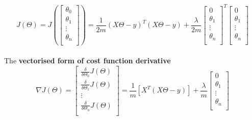 \documentclass{article}
\begin{document}
\begin{equation}
J(\Theta) = J\left( \begin{bmatrix} 
\theta_0 \\ 
\theta_1 \\
\vdots \\
\theta_n\\
\end{bmatrix} \right) = \frac{1}{2m} ( X\Theta - y )^T ( X\Theta - y ) +  \frac{\lambda}{2m}
\begin{bmatrix} 
0 \\ 
\theta_1 \\
\vdots \\
\theta_n\\
\end{bmatrix}^T
\begin{bmatrix} 
0 \\ 
\theta_1 \\
\vdots \\
\theta_n\\
\end{bmatrix}
\end{equation}\\
\color{black}
The \textbf{vectorised form of cost function derivative}
\color{red}
\begin{equation}
\nabla J(\Theta) = 
\begin{bmatrix} 
\frac{\delta}{\delta\Theta_0}J(\Theta)\\ 
\frac{\delta}{\delta\Theta_1}J(\Theta) \\
\vdots \\
\frac{\delta}{\delta\Theta_n}J(\Theta)\\
\end{bmatrix}  
= \frac{1}{m}
\left[X^T(X\Theta-y)\right]
+ \frac{\lambda}{m}
\begin{bmatrix} 
0 \\ 
\theta_1 \\
\vdots \\
\theta_n\\
\end{bmatrix}
\end{equation}
\color{black}
\end{document}
